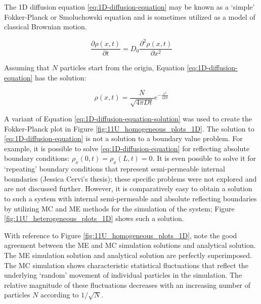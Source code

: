 	\nointerlineskip The 1D diffusion equation \ref{eq:1D-diffusion-equation} may be known as a `simple' Fokker-Planck or Smoluchowski equation and is sometimes utilized as a model of classical Brownian motion.
	
	\begin{equation}
	\label{eq:1D-diffusion-equation}
		\frac{\partial\rho(x,t)}{\partial t} = D_0 \frac{\partial^2 \rho(x,t)}{\partial x^2}
	\end{equation}
	
	Assuming that $ N $ particles start from the origin, Equation \ref{eq:1D-diffusion-equation} has the solution:
	
	\begin{equation}
	\label{eq:1D-diffusion-equation-solution}
		\rho(x,t)=\frac{N}{\sqrt{4\pi Dt}}e^{-\frac{x^2}{4Dt}}
	\end{equation}	
	
	A variant of Equation \ref{eq:1D-diffusion-equation-solution} was used to create the Fokker-Planck plot in Figure \ref{fig:11U_homogeneous_plots_1D}. The solution to \ref{eq:1D-diffusion-equation} is not a solution to a boundary value problem. For example, it is possible to solve \ref{eq:1D-diffusion-equation} for reflecting absolute boundary conditions: $ \rho_x(0,t) = \rho_x(L,t) = 0 $. It is even possible to solve it for `repeating' boundary conditions that represent semi-permeable internal boundaries (Jessica Cervi's thesis); these specific problems were not explored and are not discussed further. However, it is comparatively easy to obtain a solution to such a system with internal semi-permeable and absolute reflecting boundaries by utilizing MC and ME methods for the simulation of the system; Figure \ref{fig:11U_heterogeneous_plots_1D} shows such a solution.
	
	With reference to Figure \ref{fig:11U_homogeneous_plots_1D}, note the good agreement between the ME and MC simulation solutions and analytical solution. The ME simulation solution and analytical solution are perfectly superimposed. The MC simulation shows characteristic statistical fluctuations that reflect the underlying `random' movement of individual particles in the simulation. The relative magnitude of these fluctuations decreases with an increasing number of particles $ N $ according to $ 1/\sqrt{N} $.

